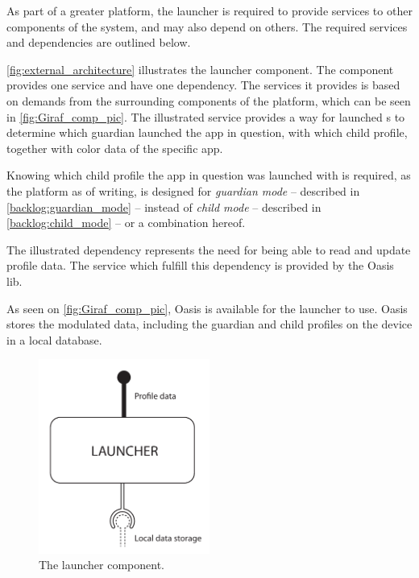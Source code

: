 \label{design:overview}
\label{sec:design_overview}
As part of a greater platform, the launcher is required to provide services to other components of the \giraf[] system, and may also depend on others.
The required services and dependencies are outlined below.

\autoref{fig:external_architecture} illustrates the \giraf[] launcher component. The component provides one service and have one dependency.
The services it provides is based on demands from the surrounding components of the \giraf[] platform, which can be seen in \autoref{fig:Giraf_comp_pic}.
The illustrated service provides a way for launched \girafapp[]s to determine which guardian launched the app in question, with which child profile, together with color data of the specific app.

Knowing which child profile the app in question was launched with is required, as the \giraf[] platform as of writing, is designed for \emph{guardian mode} -- described in \autoref{backlog:guardian_mode} -- instead of \emph{child mode} -- described in \autoref{backlog:child_mode} -- or a combination hereof.

The illustrated dependency represents the need for being able to read and update profile data. The service which fulfill this dependency is provided by the Oasis lib. 

As seen on \autoref{fig:Giraf_comp_pic}, Oasis is available for the launcher to use. Oasis stores the modulated data, including the guardian and child profiles on the device in a local database.


\begin{figure}[h]
	\centering
	\includegraphics[width=0.5\textwidth]{gfx/external_launcher_architecture.pdf}
	\caption{The  \giraf[] launcher component.}
	\label{fig:external_architecture}
\end{figure}

